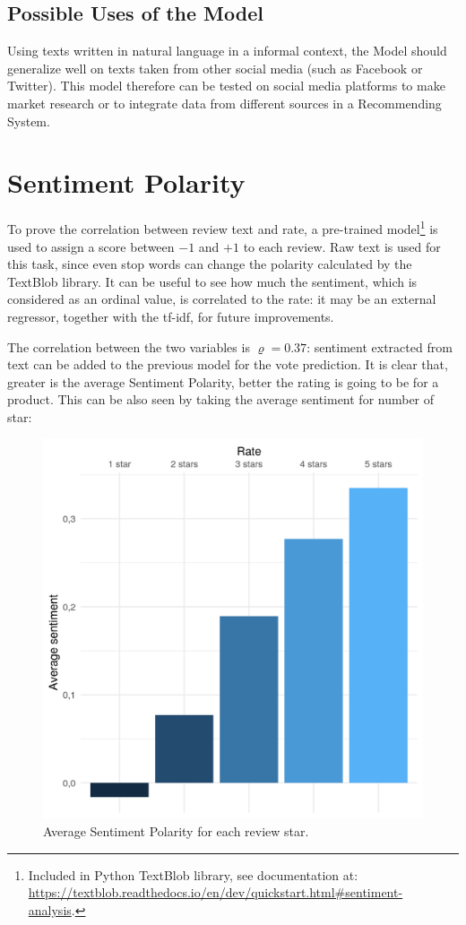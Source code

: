 \documentclass[fleqn,10pt]{SelfArx}
\begin{document}
\subsection{Possible Uses of the Model}
Using texts written in natural language in a informal context, the Model should generalize well on texts taken from other social media (such as Facebook or Twitter).
This model therefore can be tested on social media platforms to make market research or to integrate data from different sources in a Recommending System.


\section{Sentiment Polarity}
To prove the correlation between review text and rate, a pre-trained model\footnote{Included in Python TextBlob library, see documentation at: \url{https://textblob.readthedocs.io/en/dev/quickstart.html\#sentiment-analysis}.} is used to assign a score between $-1$ and $+1$ to each review.
Raw text is used for this task, since even stop words can change the polarity calculated by the TextBlob library.
It can be useful to see how much the sentiment, which is considered as an ordinal value, is correlated to the rate: it may be an external regressor, together with the tf-idf, for future improvements.

The correlation between the two variables is $\varrho = 0.37$: sentiment extracted from text can be added to the previous model for the vote prediction. 
It is clear that, greater is the average Sentiment Polarity, better the rating is going to be for a product.
This can be also seen by taking the average sentiment for number of star:
\begin{figure}[!h]
    \includegraphics[width=\linewidth]{sentiment.png}
    \caption{Average Sentiment Polarity for each review star.}
    \label{fig:sentiment}
\end{figure}
\end{document}
